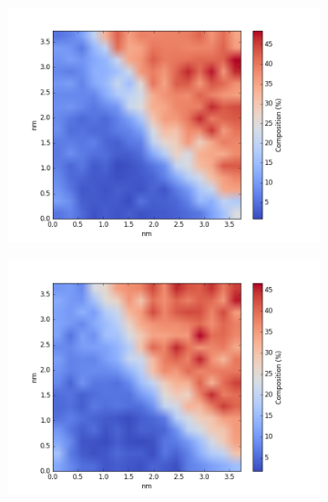 \begin{figure}
	\centering
	\begin{subfigure}{0.45\textwidth}
		\includegraphics[width=\textwidth]{fig/q/D_heated/_binned_As_zetaAbs}
		\caption{}
		\label{fig:Das}
	\end{subfigure}%
	\hfill
	\begin{subfigure}{0.45\textwidth}
		\includegraphics[width=\textwidth]{fig/q/D_heated/_binned_Ga_zetaAbs}
		\caption{}
		\label{fig:Dga}
	\end{subfigure}
	\centering
	\begin{subfigure}{0.45\textwidth}

\end{subfigure}
\end{figure}
